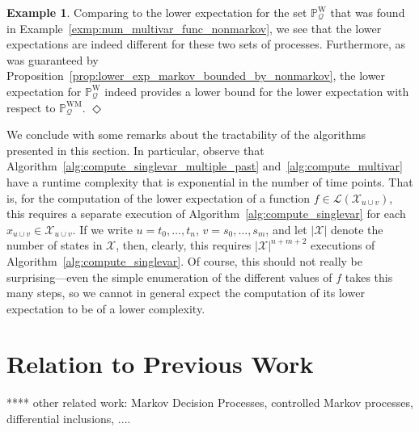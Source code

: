 \documentclass[10pt,a4paper]{paper}
\theoremstyle{definition}
\newtheorem{exmp}{Example}%
\newcommand{\states}{\mathcal{X}}
\newcommand{\processes}{\mathbb{P}}
\newcommand{\wprocesses}{\processes^{\mathrm{W}}}
\newcommand{\wmprocesses}{\processes^{\mathrm{WM}}}
\newcommand{\gambles}{\mathcal{L}}
\newcommand{\rateset}{\mathcal{Q}}
\newcommand{\lrate}{\underline{Q}}
\newcommand{\norm}[1]{\left\lVert #1 \right\rVert}
\newcommand{\abs}[1]{\left\vert #1 \right\vert}
\newcommand{\exampleend}{\hfill$\Diamond$}
\begin{document}
\begin{exmp}
Comparing to the lower expectation for the set $\wprocesses_\rateset$ that was found in Example~\ref{exmp:num_multivar_func_nonmarkov}, we see that the lower expectations are indeed different for these two sets of processes. Furthermore, as was guaranteed by Proposition~\ref{prop:lower_exp_markov_bounded_by_nonmarkov}, the lower expectation for $\wprocesses_\rateset$ indeed provides a lower bound for the lower expectation with respect to $\wmprocesses_\rateset$.
\exampleend
\end{exmp}

We conclude with some remarks about the tractability of the algorithms presented in this section. In particular, observe that Algorithm~\ref{alg:compute_singlevar_multiple_past} and~\ref{alg:compute_multivar} have a runtime complexity that is exponential in the number of time points. That is, for the computation of the lower expectation of a function $f\in\gambles(\states_{u\cup v})$, this requires a separate execution of Algorithm~\ref{alg:compute_singlevar} for each $x_{u\cup v}\in\states_{u\cup v}$. If we write $u=t_0,\ldots,t_n$, $v=s_0,\ldots,s_m$, and let $\abs{\states}$ denote the number of states in $\states$, then, clearly, this requires $\abs{\states}^{n+m+2}$ executions of Algorithm~\ref{alg:compute_singlevar}. Of course, this should not really be surprising---even the simple enumeration of the different values of $f$ takes this many steps, so we cannot in general expect the computation of its lower expectation to be of a lower complexity.



\section{Relation to Previous Work}\label{sec:prev_work}

**** other related work: Markov Decision Processes, controlled Markov processes, differential inclusions, ....
\end{document}
